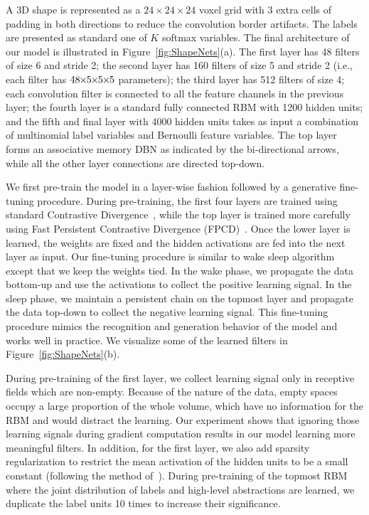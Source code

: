 \documentclass[10pt,twocolumn,letterpaper]{article}
\begin{document}
A 3D shape is represented as a $24\times24\times24$ voxel grid with 3 extra cells of padding in both directions to reduce the convolution border artifacts. The labels are presented as standard one of $K$ softmax variables.
The final architecture of our model is illustrated in Figure~\ref{fig:ShapeNets}(a). The first layer has 48 filters of size 6 and stride 2; the second layer has 160 filters of size 5 and stride 2 
(i.e., each filter has $48\hspace{-1mm}\times\hspace{-1mm}5\hspace{-1mm}\times\hspace{-1mm}5\hspace{-1mm}\times\hspace{-1mm}5$ parameters); the third layer has 512 filters of size 4; each convolution filter is connected to all the feature channels in the previous layer; the fourth layer is a standard fully connected RBM with 1200 hidden units; and the fifth and final layer with 4000 hidden units takes as input a combination of multinomial label variables and Bernoulli feature variables. The top layer forms an associative memory DBN as indicated by the bi-directional arrows, while all the other layer connections are directed top-down. 

We first pre-train the model in a layer-wise fashion followed by a generative fine-tuning procedure. During pre-training, the first four layers are trained using standard Contrastive Divergence~\cite{CD}, while the top layer is trained more carefully using Fast Persistent Contrastive Divergence (FPCD)~\cite{FPCD}. Once the lower layer is learned, the weights are fixed and the hidden activations are fed into the next layer as input. Our fine-tuning procedure is similar to wake sleep algorithm~\cite{DBN} except that we keep the weights tied. In the wake phase, we propagate the data bottom-up and use the activations to collect the positive learning signal. In the sleep phase, we maintain a persistent chain on the topmost layer and propagate the data top-down to collect the negative learning signal. This fine-tuning procedure mimics the recognition and generation behavior of the model and works well in practice. 
We visualize some of the learned filters in Figure~\ref{fig:ShapeNets}(b).

During pre-training of the first layer, we collect learning signal only in receptive fields which are non-empty. Because of the nature of the data, empty spaces occupy a large proportion of the whole volume, which have no information for the RBM and would distract the learning. Our experiment shows that ignoring those learning signals during gradient computation results in our model learning more meaningful filters. In addition, for the first layer, we also add sparsity regularization to restrict the mean activation of the hidden units to be a small constant (following the method of~\cite{Sparsity}).
During pre-training of the topmost RBM where the joint distribution of labels and high-level abstractions are learned, we duplicate the label units 10 times to increase their significance.
\end{document}
